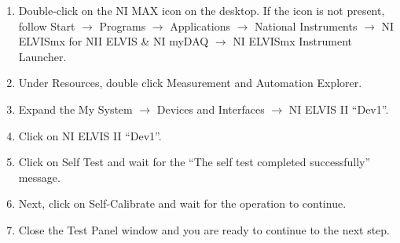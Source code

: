 \documentclass{article}
\begin{document}
\begin{enumerate}
	\item Double-click on the NI MAX icon on the desktop. If the icon is not present, follow Start $\rightarrow$ Programs $\rightarrow$ Applications $\rightarrow$ National Instruments $\rightarrow$ NI ELVISmx for NII ELVIS \& NI myDAQ $\rightarrow$ NI ELVISmx Instrument Launcher.
	\item Under Resources, double click Measurement and Automation Explorer.
	\item Expand the My System $\rightarrow$ Devices and Interfaces $\rightarrow$ NI ELVIS II “Dev1”.
	\item Click on NI ELVIS II “Dev1”.
	\item Click on Self Test and wait for the “The self test completed successfully” message.
	\item Next, click on Self-Calibrate and wait for the operation to continue.
	\item Close the Test Panel window and you are ready to continue to the next step.
\end{enumerate}
\end{document}
